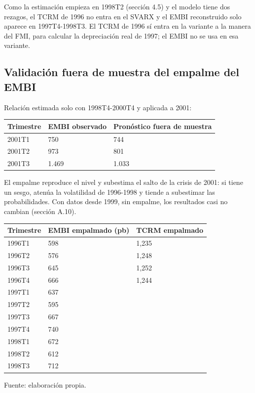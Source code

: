 Como la estimación empieza en 1998T2 (sección 4.5) y el modelo tiene dos
rezagos, el TCRM de 1996 no entra en el SVARX y el EMBI reconstruido
solo aparece en 1997T4-1998T3. El TCRM de 1996 sí entra en la variante a
la manera del FMI, para calcular la depreciación real de 1997; el EMBI
no se usa en esa variante.

\subsection{Validación fuera de muestra del empalme del EMBI}

Relación estimada solo con 1998T4-2000T4 y aplicada a 2001:

\begin{longtable}[]{@{}lll@{}}
\toprule\noalign{}
Trimestre & EMBI observado & Pronóstico fuera de muestra \\
\midrule\noalign{}
\endhead
\bottomrule\noalign{}
\endlastfoot
2001T1 & 750 & 744 \\
2001T2 & 973 & 801 \\
2001T3 & 1.469 & 1.033 \\
\end{longtable}

El empalme reproduce el nivel y subestima el salto de la crisis de 2001:
si tiene un sesgo, atenúa la volatilidad de 1996-1998 y tiende a
subestimar las probabilidades. Con datos desde 1999, sin empalme, los
resultados casi no cambian (sección A.10).

\begin{longtable}[]{@{}lll@{}}
\toprule\noalign{}
Trimestre & EMBI empalmado (pb) & TCRM empalmado \\
\midrule\noalign{}
\endhead
\bottomrule\noalign{}
\endlastfoot
1996T1 & 598 & 1,235 \\
1996T2 & 576 & 1,248 \\
1996T3 & 645 & 1,252 \\
1996T4 & 666 & 1,244 \\
1997T1 & 637 & \\
1997T2 & 595 & \\
1997T3 & 667 & \\
1997T4 & 740 & \\
1998T1 & 672 & \\
1998T2 & 612 & \\
1998T3 & 712 & \\
\end{longtable}

Fuente: elaboración propia.

